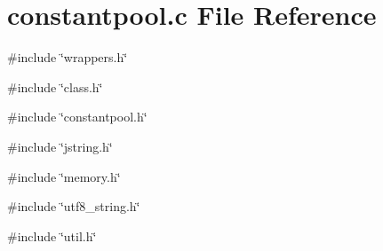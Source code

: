 \section{constantpool.c File Reference}
\label{constantpool_8c}
{\ttfamily \#include \char`\"{}wrappers.h\char`\"{}}\par
{\ttfamily \#include \char`\"{}class.h\char`\"{}}\par
{\ttfamily \#include \char`\"{}constantpool.h\char`\"{}}\par
{\ttfamily \#include \char`\"{}jstring.h\char`\"{}}\par
{\ttfamily \#include \char`\"{}memory.h\char`\"{}}\par
{\ttfamily \#include \char`\"{}utf8\_\-string.h\char`\"{}}\par
{\ttfamily \#include \char`\"{}util.h\char`\"{}}\par
